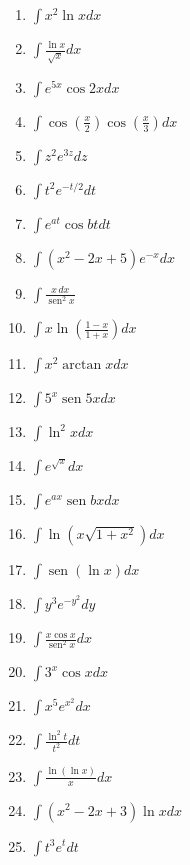 \documentclass{article}
\begin{document}
\begin{multicols}{2}
\begin{enumerate}
    \item $\displaystyle \int x^2 \ln x dx$
    \item $\displaystyle \int \frac{\ln x}{\sqrt{x}} dx$
    \item $\displaystyle \int e^{5x} \cos 2x dx$
    \item $\displaystyle \int \cos \left(\frac{x}{2}\right) \cos \left(\frac{x}{3}\right) dx$
    \item $\displaystyle \int z^2 e^{3z} dz$
    \item $\displaystyle \int t^2 e^{-t/2} dt$
    \item $\displaystyle \int e^{at} \cos bt dt$
    \item $\displaystyle \int (x^2 - 2x + 5) e^{-x} dx$
    \item $\displaystyle \int \frac{x \, dx}{\operatorname{sen}^2 x}$
    \item $\displaystyle \int x \ln \left(\frac{1 - x}{1 + x}\right) dx$
    \item $\displaystyle \int x^2 \operatorname{arctan} x dx$
    \item $\displaystyle \int 5^x \operatorname{sen} 5x dx$
    \item $\displaystyle \int \ln^2 x dx$
    \item $\displaystyle \int e^{\sqrt{x}} dx$
    \item $\displaystyle \int e^{ax} \operatorname{sen} bx dx$
    \item $\displaystyle \int \ln (x \sqrt{1 + x^2}) dx$
    \item $\displaystyle \int \operatorname{sen} (\ln x) dx$
    \item $\displaystyle \int y^3 e^{-y^2} dy$
    \item $\displaystyle \int \frac{x \cos x}{\operatorname{sen}^2 x} dx$
    \item $\displaystyle \int 3^x \cos x dx$
    \item $\displaystyle \int x^5 e^{x^2} dx$
    \item $\displaystyle \int \frac{\ln^2 t}{t^2} dt$
    \item $\displaystyle \int \frac{\ln(\ln x)}{x} dx$
    \item $\displaystyle \int (x^2 - 2x + 3) \ln x dx$
    \item $\displaystyle \int t^3 e^t dt$

\end{enumerate}
\end{multicols}
\end{document}
